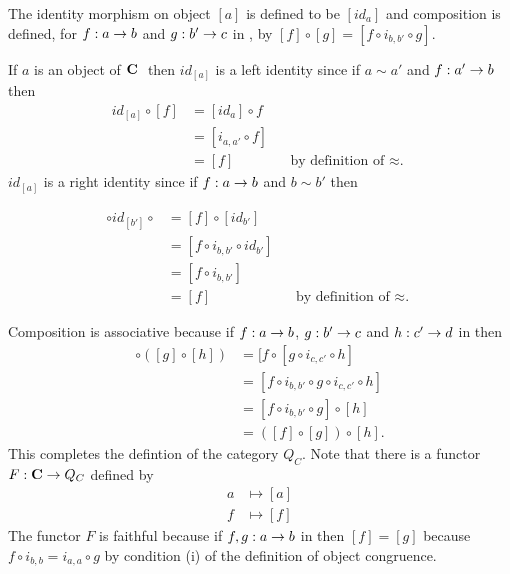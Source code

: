 \documentclass[10pt,a4paper]{scrartcl}
\begin{document}
The identity morphism on object $[a]$ is defined to be $[id_a]$
and composition  is defined,  for
 $f:a \rightarrow b$ and $g: b' \rightarrow c$ in \catcw, by $[f] \circ [g]=[f \circ i_{b,b'} \circ g]$.

If $a$ is an object of $\textbf{C}\ $ then $id_{[a]}$ is a left identity since if  $a \sim a'$ and $f:a' \rightarrow b$ then 
\begin{align*}
id_{[a]} \circ [f] & = [id_a] \circ f                                             \\
                 &= [i_{a,a'} \circ f]                                            \\
                 &= [f]                & &\mbox {by definition of $\approx$. }
\end{align*}
$id_{[a]}$ is a right identity since if $f:a \rightarrow b$ and $b \sim b'$  then

\begin{align*}
[f] \circ id_{[b']} \circ  & = [f]  \circ [id_{b'}]                                     \\
                 &=  [f \circ i_{b,b'} \circ id_{b'} ]                                  \\
                 &=  [f \circ i_{b,b'} ]                                                \\
                 &=  [f]                & &\mbox {by definition of $\approx$. }
\end{align*}


Composition is associative because if $f:a \rightarrow b$, $g: b' \rightarrow c$  and $h: c' \rightarrow d$ in \catcw then
\begin{align*}
[f] \circ ([g] \circ [h]) &= [f \circ [g \circ i_{c,c'} \circ h]               \\
                          &= [f \circ i_{b,b'} \circ g \circ i_{c,c'} \circ h] \\
													&= [f \circ i_{b,b'} \circ g] \circ [h]              \\
													&= ([f] \circ [g]) \circ [h].
\end{align*}
This completes the defintion of the category $Q_C$.
Note that there is a functor $F: \textbf{C} \rightarrow Q_C$ defined by
\begin{align*}
       a & \mapsto [a] \\
			 f & \mapsto [f]
\end{align*}
The functor $F$ is faithful because if $f,g : a \rightarrow b$ in \catcw then $[f]=[g]$ because $f \circ i_{b,b}=i_{a,a} \circ g$ by condition (i) of the definition of object congruence.
\newpage
\end{document}
